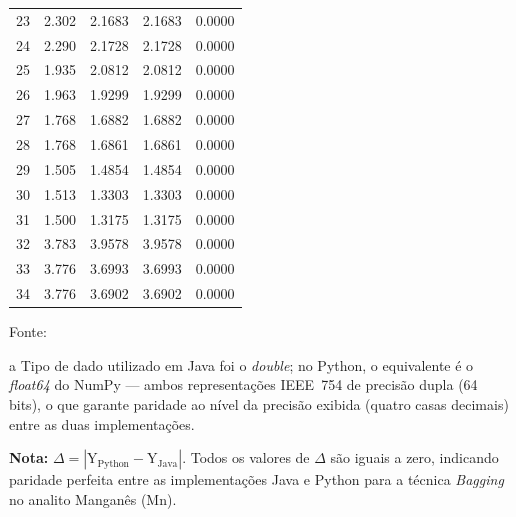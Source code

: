 \begin{table}[H]
\begin{threeparttable}
{\begin{tabular}{
    S[table-format=2.0]
    S[table-format=2.3]
    S[table-format=2.4]
    S[table-format=2.4]
    S[table-format=1.4]
}
 23 &   2.302 &   2.1683 &   2.1683 & 0.0000 \\
 24 &   2.290 &   2.1728 &   2.1728 & 0.0000 \\
 25 &   1.935 &   2.0812 &   2.0812 & 0.0000 \\
 26 &   1.963 &   1.9299 &   1.9299 & 0.0000 \\
 27 &   1.768 &   1.6882 &   1.6882 & 0.0000 \\
 28 &   1.768 &   1.6861 &   1.6861 & 0.0000 \\
 29 &   1.505 &   1.4854 &   1.4854 & 0.0000 \\
 30 &   1.513 &   1.3303 &   1.3303 & 0.0000 \\
 31 &   1.500 &   1.3175 &   1.3175 & 0.0000 \\
 32 &   3.783 &   3.9578 &   3.9578 & 0.0000 \\
 33 &   3.776 &   3.6993 &   3.6993 & 0.0000 \\
 34 &   3.776 &   3.6902 &   3.6902 & 0.0000 \\
\bottomrule
\end{tabular}%
}
\begin{center}
\begin{minipage}{0.85\linewidth}
\begin{tablenotes}
\footnotesize
\item Fonte:~\oautor
\item[a] Tipo de dado utilizado em Java foi o \textit{double}; no Python,
o equivalente é o \textit{float64} do NumPy — ambos representações IEEE~754
de precisão dupla (64 bits), o que garante paridade ao nível da precisão exibida (quatro casas decimais) entre as
duas implementações.
\item \textbf{Nota:} $\Delta = |\text{Y}_{\text{Python}} - \text{Y}_{\text{Java}}|$.
Todos os valores de $\Delta$ são iguais a zero, indicando paridade
perfeita entre as implementações Java e Python para a técnica \textit{Bagging}
no analito Manganês (Mn).
\end{tablenotes}
\end{minipage}
\end{center}
\end{threeparttable}
\end{table}

